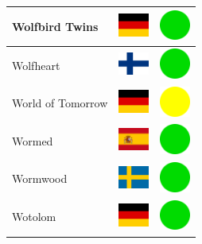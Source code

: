 \documentclass[12pt, a4paper, twoside]{report}
\begin{document}
\begin{center}
\begin{longtable}{|p{5cm}|p{2cm}|p{2cm}|}
 Wolfbird Twins                                             & \includegraphics[width=1cm]{../img/flags/de} &   \includegraphics[width=1cm]{../likes/y} \\ \hline
 Wolfheart                                                  & \includegraphics[width=1cm]{../img/flags/fi} &   \includegraphics[width=1cm]{../likes/y} \\ \hline
 World of Tomorrow                                          & \includegraphics[width=1cm]{../img/flags/de} &   \includegraphics[width=1cm]{../likes/m} \\ \hline
 Wormed                                                     & \includegraphics[width=1cm]{../img/flags/es} &   \includegraphics[width=1cm]{../likes/y} \\ \hline
 Wormwood                                                   & \includegraphics[width=1cm]{../img/flags/se} &   \includegraphics[width=1cm]{../likes/y} \\ \hline
 Wotolom                                                    & \includegraphics[width=1cm]{../img/flags/de} &   \includegraphics[width=1cm]{../likes/y} \\ \hline

\end{longtable}
\end{center}
\end{document}

